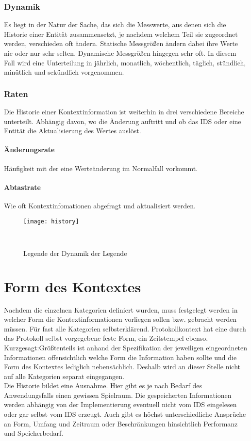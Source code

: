 \subsubsection{Dynamik}
Es liegt in der Natur der Sache, das sich die Messwerte, aus denen sich die Historie einer Entität zusammensetzt, je nachdem welchem Teil sie zugeordnet werden, verschieden oft ändern.
Statische Messgrößen ändern dabei ihre Werte nie oder nur sehr selten. Dynamische Messgrößen hingegen sehr oft. In diesem Fall wird eine Unterteilung in jährlich, monatlich, wöchentlich, täglich, stündlich, minütlich und sekündlich vorgenommen. 
\subsubsection{Raten}
Die Historie einer Kontextinformation ist weiterhin in drei verschiedene Bereiche unterteilt. Abhängig davon, wo die Änderung auftritt und ob das IDS oder eine Entität die Aktualisierung des Wertes auslöst.
\paragraph{Änderungsrate} 
Häufigkeit mit der eine Werteänderung im Normalfall vorkommt.
\paragraph{Abtastrate}
Wie oft Kontextinfomationen abgefragt und aktualisiert werden.
\begin{figure}[H]
\centering
\texttt{[image: history]}
\caption{Legende der Dynamik der Legende}
\
\end{figure}


\section{Form des Kontextes}
Nachdem die einzelnen Kategorien definiert wurden, muss festgelegt werden in welcher Form die Kontextinformationen vorliegen sollen bzw. gebracht werden müssen. Für fast alle Kategorien selbsterklärend. Protokollkontext hat eine durch das Protokoll selbst vorgegebene feste Form, ein Zeitstempel ebenso. Kurzgesagt:Größtenteils ist anhand der Spezifikation der jeweiligen eingeordneten Informationen offensichtlich welche Form die Information haben sollte und die Form des Kontextes lediglich nebensächlich. Deshalb wird an dieser Stelle nicht auf alle Kategorien separat eingegangen.\\
Die Historie bildet eine Ausnahme. Hier gibt es je nach Bedarf des Anwendungsfalls einen gewissen Spielraum. Die gespeicherten Informationen werden abhängig von der Implementierung eventuell nicht vom IDS eingelesen oder gar selbst vom IDS erzeugt. Auch gibt es höchst unterschiedliche Ansprüche an Form, Umfang und Zeitraum oder Beschränkungen hinsichtlich Performanz und Speicherbedarf.
